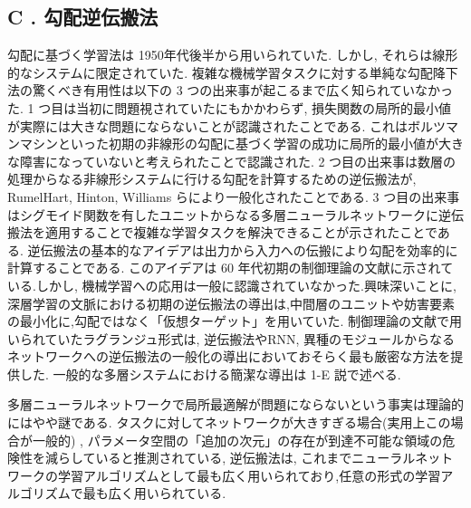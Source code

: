 \documentclass[twocolumn]{jarticle}     %
\begin{document}
\subsection*{C . 勾配逆伝搬法}
勾配に基づく学習法は 1950年代後半から用いられていた. しかし, それらは線形的なシステムに限定されていた. 複雑な機械学習タスクに対する単純な勾配降下法の驚くべき有用性は以下の 3 つの出来事が起こるまで広く知られていなかった.
 1 つ目は当初に問題視されていたにもかかわらず, 損失関数の局所的最小値が実際には大きな問題にならないことが認識されたことである. これはボルツマンマシンといった初期の非線形の勾配に基づく学習の成功に局所的最小値が大きな障害になっていないと考えられたことで認識された.
 2 つ目の出来事は数層の処理からなる非線形システムに行ける勾配を計算するための逆伝搬法が, RumelHart, Hinton, Williams らにより一般化されたことである. 3 つ目の出来事はシグモイド関数を有したユニットからなる多層ニューラルネットワークに逆伝搬法を適用することで複雑な学習タスクを解決できることが示されたことである.
 逆伝搬法の基本的なアイデアは出力から入力への伝搬により勾配を効率的に計算することである. このアイデアは 60 年代初期の制御理論の文献に示されている.しかし, 機械学習への応用は一般に認識されていなかった.興味深いことに, 深層学習の文脈における初期の逆伝搬法の導出は,中間層のユニットや妨害要素の最小化に,勾配ではなく「仮想ターゲット」を用いていた.
 制御理論の文献で用いられていたラグランジュ形式は, 逆伝搬法やRNN, 異種のモジュールからなるネットワークへの逆伝搬法の一般化の導出においておそらく最も厳密な方法を提供した.
  一般的な多層システムにおける簡潔な導出は 1-E 説で述べる.
\par
多層ニューラルネットワークで局所最適解が問題にならないという事実は理論的にはやや謎である. タスクに対してネットワークが大きすぎる場合(実用上この場合が一般的) , パラメータ空間の「追加の次元」の存在が到達不可能な領域の危険性を減らしていると推測されている,
逆伝搬法は, これまでニューラルネットワークの学習アルゴリズムとして最も広く用いられており,任意の形式の学習アルゴリズムで最も広く用いられている.
\end{document}
